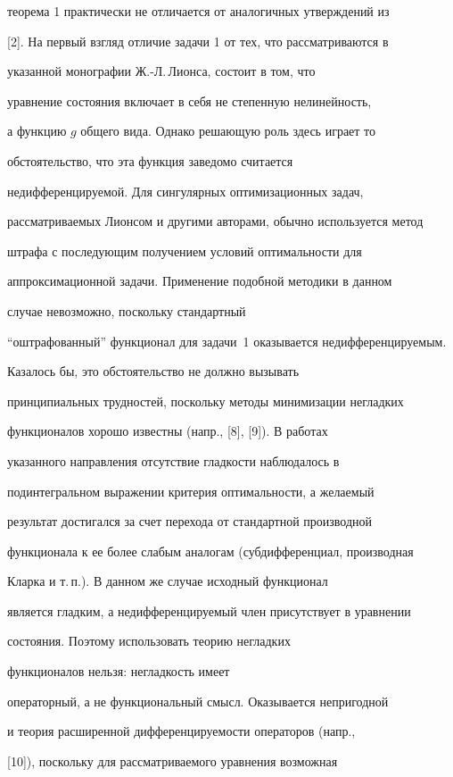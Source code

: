 теорема 1 практически не отличается от аналогичных утверждений из 


[2]. На первый взгляд отличие задачи 1 от тех, что рассматриваются в 


указанной монографии Ж.-Л.\,Лионса, состоит в том, что


уравнение состояния включает в себя не степенную нелинейность, 


а функцию $g$ общего вида. Однако решающую роль здесь играет то 


обстоятельство, что эта функция заведомо считается 


недифференцируемой. Для сингулярных оптимизационных задач, 


рассматриваемых Лионсом и другими авторами, обычно используется метод 


штрафа с последующим получением условий оптимальности для 


аппроксимационной задачи. Применение подобной методики в данном 


случае невозможно, поскольку стандартный 


``оштрафованный'' функционал для задачи~1 оказывается недифференцируемым.


Казалось бы, это обстоятельство не должно вызывать 


принципиальных трудностей, поскольку методы минимизации негладких 


функционалов хорошо известны (напр., [8], [9]). В работах 


указанного направления отсутствие гладкости наблюдалось в 


подинтегральном выражении критерия оптимальности, а желаемый 


результат достигался за счет перехода от стандартной производной 


функционала к ее более слабым аналогам (субдифференциал, производная 


Кларка и т.\,п.). В данном же случае исходный функционал 


является гладким, а недифференцируемый член присутствует в уравнении 


состояния. Поэтому использовать теорию негладких 


функционалов нельзя: негладкость имеет 


операторный, а не функциональный смысл. Оказывается непригодной 


и теория расширенной дифференцируемости операторов (напр., 


[10]), поскольку для рассматриваемого уравнения возможная 


